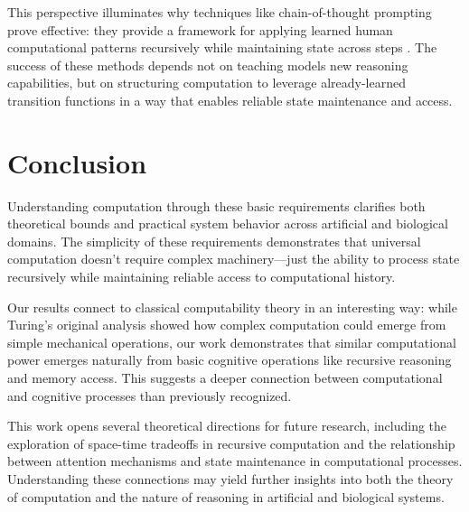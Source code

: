 \documentclass[12pt]{article}
\begin{document}
This perspective illuminates why techniques like chain-of-thought prompting prove effective: they provide a framework for applying learned human computational patterns recursively while maintaining state across steps \cite{wei2022chain}. The success of these methods depends not on teaching models new reasoning capabilities, but on structuring computation to leverage already-learned transition functions in a way that enables reliable state maintenance and access.

\section{Conclusion}

Understanding computation through these basic requirements clarifies both theoretical bounds and practical system behavior across artificial and biological domains. The simplicity of these requirements demonstrates that universal computation doesn't require complex machinery---just the ability to process state recursively while maintaining reliable access to computational history.

Our results connect to classical computability theory in an interesting way: while Turing's original analysis showed how complex computation could emerge from simple mechanical operations, our work demonstrates that similar computational power emerges naturally from basic cognitive operations like recursive reasoning and memory access. This suggests a deeper connection between computational and cognitive processes than previously recognized.

This work opens several theoretical directions for future research, including the exploration of space-time tradeoffs in recursive computation and the relationship between attention mechanisms and state maintenance in computational processes. Understanding these connections may yield further insights into both the theory of computation and the nature of reasoning in artificial and biological systems.

\begingroup
\footnotesize


\endgroup
\end{document}
